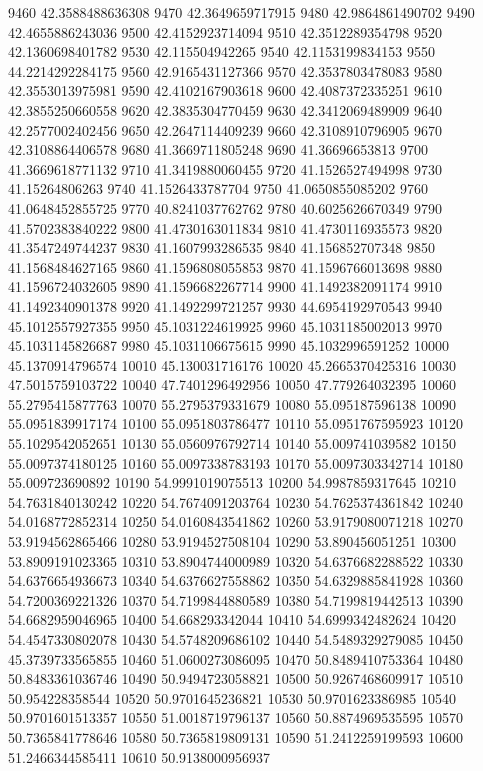 {9460 42.3588488636308
9470 42.3649659717915
9480 42.9864861490702
9490 42.4655886243036
9500 42.4152923714094
9510 42.3512289354798
9520 42.1360698401782
9530 42.115504942265
9540 42.1153199834153
9550 44.2214292284175
9560 42.9165431127366
9570 42.3537803478083
9580 42.3553013975981
9590 42.4102167903618
9600 42.4087372335251
9610 42.3855250660558
9620 42.3835304770459
9630 42.3412069489909
9640 42.2577002402456
9650 42.2647114409239
9660 42.3108910796905
9670 42.3108864406578
9680 41.3669711805248
9690 41.36696653813
9700 41.3669618771132
9710 41.3419880060455
9720 41.1526527494998
9730 41.15264806263
9740 41.1526433787704
9750 41.0650855085202
9760 41.0648452855725
9770 40.8241037762762
9780 40.6025626670349
9790 41.5702383840222
9800 41.4730163011834
9810 41.4730116935573
9820 41.3547249744237
9830 41.1607993286535
9840 41.156852707348
9850 41.1568484627165
9860 41.1596808055853
9870 41.1596766013698
9880 41.1596724032605
9890 41.1596682267714
9900 41.1492382091174
9910 41.1492340901378
9920 41.1492299721257
9930 44.6954192970543
9940 45.1012557927355
9950 45.1031224619925
9960 45.1031185002013
9970 45.1031145826687
9980 45.1031106675615
9990 45.1032996591252
10000 45.1370914796574
10010 45.130031716176
10020 45.2665370425316
10030 47.5015759103722
10040 47.7401296492956
10050 47.779264032395
10060 55.2795415877763
10070 55.2795379331679
10080 55.095187596138
10090 55.0951839917174
10100 55.0951803786477
10110 55.0951767595923
10120 55.1029542052651
10130 55.0560976792714
10140 55.009741039582
10150 55.0097374180125
10160 55.0097338783193
10170 55.0097303342714
10180 55.009723690892
10190 54.9991019075513
10200 54.9987859317645
10210 54.7631840130242
10220 54.7674091203764
10230 54.7625374361842
10240 54.0168772852314
10250 54.0160843541862
10260 53.9179080071218
10270 53.9194562865466
10280 53.9194527508104
10290 53.890456051251
10300 53.8909191023365
10310 53.8904744000989
10320 54.6376682288522
10330 54.6376654936673
10340 54.6376627558862
10350 54.6329885841928
10360 54.7200369221326
10370 54.7199844880589
10380 54.7199819442513
10390 54.6682959046965
10400 54.668293342044
10410 54.6999342482624
10420 54.4547330802078
10430 54.5748209686102
10440 54.5489329279085
10450 45.3739733565855
10460 51.0600273086095
10470 50.8489410753364
10480 50.8483361036746
10490 50.9494723058821
10500 50.9267468609917
10510 50.954228358544
10520 50.9701645236821
10530 50.9701623386985
10540 50.9701601513357
10550 51.0018719796137
10560 50.8874969535595
10570 50.7365841778646
10580 50.7365819809131
10590 51.2412259199593
10600 51.2466344585411
10610 50.9138000956937
}
